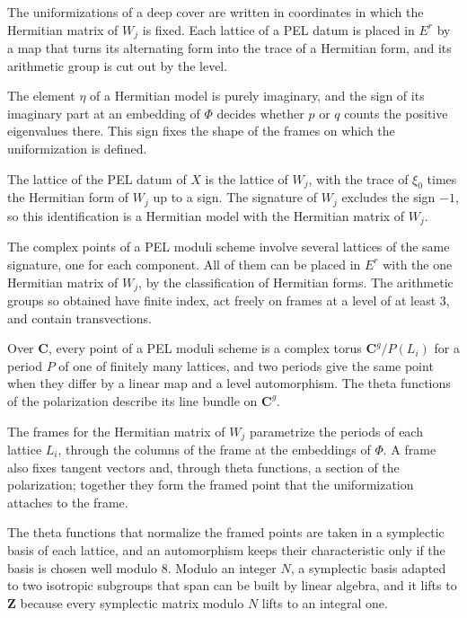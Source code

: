 The uniformizations of a deep cover are written in coordinates in which the Hermitian matrix of $W_j$
is fixed. Each lattice of a PEL datum is placed in $E^r$ by a map that turns its alternating form into
the trace of a Hermitian form, and its arithmetic group is cut out by the level.

The element $\eta$ of a Hermitian model is purely imaginary, and the sign of its imaginary part at an
embedding of $\Phi$ decides whether $p$ or $q$ counts the positive eigenvalues there. This sign fixes
the shape of the frames on which the uniformization is defined.

The lattice of the PEL datum of $X$ is the lattice of $W_j$, with the trace of $\xi_0$ times the
Hermitian form of $W_j$ up to a sign. The signature of $W_j$ excludes the sign $-1$, so this
identification is a Hermitian model with the Hermitian matrix of $W_j$.

The complex points of a PEL moduli scheme involve several lattices of the same signature, one for each
component. All of them can be placed in $E^r$ with the one Hermitian matrix of $W_j$, by the
classification of Hermitian forms. The arithmetic groups so obtained have finite index, act freely on
frames at a level of at least $3$, and contain transvections.

Over $\mathbf C$, every point of a PEL moduli scheme is a complex torus $\mathbf C^g/P(L_i)$ for a period
$P$ of one of finitely many lattices, and two periods give the same point when they differ by a linear
map and a level automorphism. The theta functions of the polarization describe its line bundle on
$\mathbf C^g$.

The frames for the Hermitian matrix of $W_j$ parametrize the periods of each lattice $L_i$, through the
columns of the frame at the embeddings of $\Phi$. A frame also fixes tangent vectors and, through theta
functions, a section of the polarization; together they form the framed point that the uniformization
attaches to the frame.

The theta functions that normalize the framed points are taken in a symplectic basis of each lattice,
and an automorphism keeps their characteristic only if the basis is chosen well modulo $8$. Modulo an
integer $N$, a symplectic basis adapted to two isotropic subgroups that span can be built by linear
algebra, and it lifts to $\mathbf Z$ because every symplectic matrix modulo $N$ lifts to an integral one.

